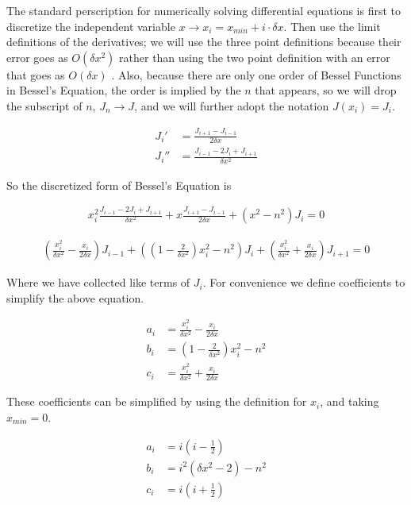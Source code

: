 \documentclass[onecolumn, groupedaddress, 10pt]{revtex4-1}
\begin{document}
The standard perscription for numerically solving differential equations is first to discretize the independent variable $x \to x_i = x_{min} + i \cdot \delta x$.  Then use the limit definitions of the derivatives; we will use the three point definitions because their error goes as $O(\delta x^2)$ rather than using the two point definition with an error that goes as $O(\delta x)$ \cite{morten}.  Also, because there are only one order of Bessel Functions in Bessel's Equation, the order is implied by the $n$ that appears, so we will drop the subscript of $n$, $J_n \to J$, and we will further adopt the notation $J(x_i) = J_i$.

\begin{align}
J_i'  &= \frac{J_{i+1} - J_{i-1}}{2 \delta x} \\
J_i'' &= \frac{J_{i-1} - 2J_{i} + J_{i+1}}{\delta x^2}
\end{align}

So the discretized form of Bessel's Equation is

\begin{align}
\label{eqn:Bessel's Equation Discretized}
x_i^2 \frac{J_{i-1} - 2J_{i} + J_{i+1}}{\delta x^2} + x \frac{J_{i+1} - J_{i-1}}{2 \delta x} + (x^2 - n^2) J_i = 0
\end{align}

\begin{align}
\left(\frac{x_i^2}{\delta x^2} - \frac{x_i}{2\delta x}\right) J_{i-1}
	+ \left( \left(1-\frac{2}{\delta x^2}\right)x_i^2 - n^2 \right) J_i
	+ \left(\frac{x_i^2}{\delta x^2} + \frac{x_i}{2\delta x}\right) J_{i+1}
	= 0
\end{align}

Where we have collected like terms of $J_i$.  For convenience we define coefficients to simplify the above equation.

\begin{align}
a_i &= \frac{x_i^2}{\delta x^2} - \frac{x_i}{2\delta x} 	\\
b_i &= \left(1-\frac{2}{\delta x^2}\right)x_i^2 - n^2  	\\
c_i &= \frac{x_i^2}{\delta x^2} + \frac{x_i}{2\delta x}
\end{align}

These coefficients can be simplified by using the definition for $x_i$, and taking $x_{min} = 0$.

\begin{align}
a_i &= i   \left( i - \frac{1}{2} \right)				\\
b_i &= i^2 \left( \delta x^2 - 2  \right) - n^2 		 	\\
c_i &= i   \left( i + \frac{1}{2} \right)
\end{align}
\end{document}

